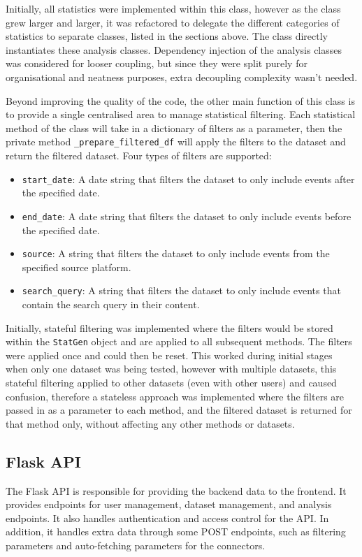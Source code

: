 \documentclass[12pt, a4paper]{article}
\begin{document}
Initially, all statistics were implemented within this class, however as the class grew larger and larger, it was refactored to delegate the different categories of statistics to separate classes, listed in the sections above. The class directly instantiates these analysis classes. Dependency injection of the analysis classes was considered for looser coupling, but since they were split purely for organisational and neatness purposes, extra decoupling complexity wasn't needed.

Beyond improving the quality of the code, the other main function of this class is to provide a single centralised area to manage statistical filtering. Each statistical method of the class will take in a dictionary of filters as a parameter, then the private method \texttt{\_prepare\_filtered\_df} will apply the filters to the dataset and return the filtered dataset. Four types of filters are supported:
\begin{itemize}
    \item \texttt{start\_date}: A date string that filters the dataset to only include events after the specified date.
    \item \texttt{end\_date}: A date string that filters the dataset to only include events before the specified date.
    \item \texttt{source}: A string that filters the dataset to only include events from the specified source platform.
    \item \texttt{search\_query}: A string that filters the dataset to only include events that contain the search query in their content.
\end{itemize}

Initially, stateful filtering was implemented where the filters would be stored within the \texttt{StatGen} object and are applied to all subsequent methods. The filters were applied once and could then be reset. This worked during initial stages when only one dataset was being tested, however with multiple datasets, this stateful filtering applied to other datasets (even with other users) and caused confusion, therefore a stateless approach was implemented where the filters are passed in as a parameter to each method, and the filtered dataset is returned for that method only, without affecting any other methods or datasets.

\subsection{Flask API}
The Flask API is responsible for providing the backend data to the frontend. It provides endpoints for user management, dataset management, and analysis endpoints. It also handles authentication and access control for the API. In addition, it handles extra data through some POST endpoints, such as filtering parameters and auto-fetching parameters for the connectors.
\end{document}
